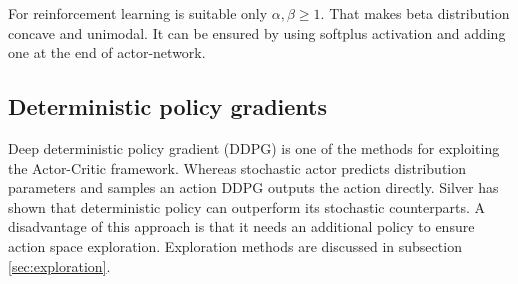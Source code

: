For reinforcement learning is suitable only $\alpha, \beta \geq 1$. That makes beta distribution concave and unimodal. It can be ensured by using softplus activation and adding one at the end of actor-network.

\subsection{Deterministic policy gradients}
Deep deterministic policy gradient (DDPG) is one of the methods for exploiting the Actor-Critic framework. Whereas stochastic actor predicts distribution parameters and samples an action DDPG outputs the action directly. Silver \cite{silver2014} has shown that deterministic policy can outperform its stochastic counterparts. A disadvantage of this approach is that it needs an additional policy to ensure action space exploration. Exploration methods are discussed in subsection \ref{sec:exploration}.

